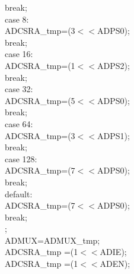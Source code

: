 \documentclass[titlepage, a4paper, 10pt, reqno, openany]{report}
\begin{document}
\begin{minipage}[t]{.3\linewidth}
	\hspace*{1.5cm}			break; \\
	\hspace*{1cm}		case 8: \\
	\hspace*{1.5cm}			ADCSRA\_tmp=(3$<<$ADPS0); \\
	\hspace*{1.5cm}			break; \\
	\hspace*{1cm}		case 16: \\
	\hspace*{1.5cm}			ADCSRA\_tmp=(1$<<$ADPS2); \\
	\hspace*{1.5cm}			break; \\
	\hspace*{1cm}		case 32: \\
	\hspace*{1.5cm}			ADCSRA\_tmp=(5$<<$ADPS0); \\
	\hspace*{1.5cm}			break; \\
	\hspace*{1cm}		case 64: \\
	\hspace*{1.5cm}			ADCSRA\_tmp=(3$<<$ADPS1); \\
	\hspace*{1.5cm}			break; \\
	\hspace*{1cm}		case 128: \\
	\hspace*{1.5cm}			ADCSRA\_tmp=(7$<<$ADPS0); \\
	\hspace*{1.5cm}			break; \\
	\hspace*{1cm}		default: \\
	\hspace*{1.5cm}			ADCSRA\_tmp=(7$<<$ADPS0); \\
	\hspace*{1.5cm}			break; \\
	\hspace*{.5cm}	\textbraceright ; \\
	\hspace*{.5cm}	ADMUX=ADMUX\_tmp; \\
	\hspace*{.5cm}	ADCSRA\_tmp \textbar =(1$<<$ADIE); \\
	\hspace*{.5cm}	ADCSRA\_tmp \textbar =(1$<<$ADEN); \\

\end{minipage}
\end{document}
